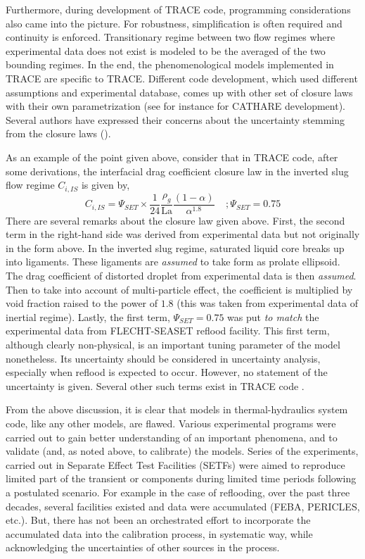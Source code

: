\documentclass[11pt,titlepage]{article}
\begin{document}
Furthermore, during development of TRACE code, programming considerations also came into the picture. 
For robustness, simplification is often required and continuity is enforced. 
Transitionary regime between two flow regimes where experimental data does not exist is modeled to be the averaged of the two bounding regimes. 
In the end, the phenomenological models implemented in TRACE are specific to TRACE. 
Different code development, which used different assumptions and experimental database, comes up with other set of closure laws with their own parametrization (see for instance \cite{Bestion1990} for CATHARE development). 
Several authors have expressed their concerns about the uncertainty stemming from the closure laws (\cite{Wulff2007, DAuria2012, Petruzzi2008}).

As an example of the point given above, consider that in TRACE code, after some derivations, the interfacial drag coefficient closure law in the inverted slug flow regime $C_{i,IS}$ is given by,
\begin{equation}
C_{i,IS} = \Psi_{SET} \times \frac{1}{24}\frac{\rho_g}{\text{La}}\frac{(1-\alpha)}{\alpha^{1.8}} \; \; \; \; ;\Psi_{SET} = 0.75
\end{equation}
There are several remarks about the closure law given above. 
First, the second term in the right-hand side was derived from experimental data but not originally in the form above. 
In the inverted slug regime, saturated liquid core breaks up into ligaments. 
These ligaments are \emph{assumed} to take form as prolate ellipsoid. 
The drag coefficient of distorted droplet from experimental data is then \emph{assumed}. 
Then to take into account of multi-particle effect, the coefficient is multiplied by void fraction raised to the power of $1.8$ (this was taken from experimental data of inertial regime). 
Lastly, the first term, $\Psi_{SET} = 0.75$ was put \emph{to match} the experimental data from FLECHT-SEASET reflood facility. 
This first term, although clearly non-physical, is an important tuning parameter of the model nonetheless. 
Its uncertainty should be considered in uncertainty analysis, especially when reflood is expected to occur. 
However, no statement of the uncertainty is given. 
Several other such terms exist in TRACE code \cite{TraceTheory2012}.

From the above discussion, it is clear that models in thermal-hydraulics system code, like any other models, are flawed. 
Various experimental programs were carried out to gain better understanding of an important phenomena, and to validate (and, as noted above, to calibrate) the models. 
Series of the experiments, carried out in Separate Effect Test Facilities (SETFs) were aimed to reproduce limited part of the transient or components during limited time periods following a postulated scenario. 
For example in the case of reflooding, over the past three decades, several facilities existed and data were accumulated (FEBA, PERICLES, etc.). 
But, there has not been an orchestrated effort to incorporate the accumulated data into the calibration process, in systematic way, while acknowledging the uncertainties of other sources in the process. 
\end{document}
